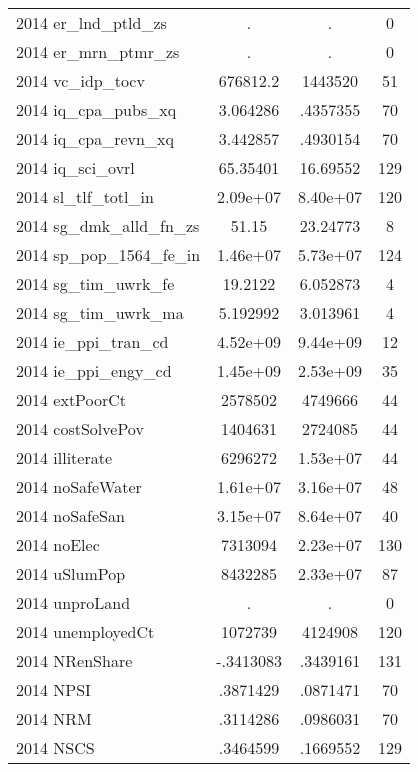 {\begin{tabular}{l*{1}{ccc}}
2014 er\_lnd\_ptld\_zs &           .&           .&           0\\
2014 er\_mrn\_ptmr\_zs &           .&           .&           0\\
2014 vc\_idp\_tocv    &    676812.2&     1443520&          51\\
2014 iq\_cpa\_pubs\_xq &    3.064286&    .4357355&          70\\
2014 iq\_cpa\_revn\_xq &    3.442857&    .4930154&          70\\
2014 iq\_sci\_ovrl    &    65.35401&    16.69552&         129\\
2014 sl\_tlf\_totl\_in &    2.09e+07&    8.40e+07&         120\\
2014 sg\_dmk\_alld\_fn\_zs&       51.15&    23.24773&           8\\
2014 sp\_pop\_1564\_fe\_in&    1.46e+07&    5.73e+07&         124\\
2014 sg\_tim\_uwrk\_fe &     19.2122&    6.052873&           4\\
2014 sg\_tim\_uwrk\_ma &    5.192992&    3.013961&           4\\
2014 ie\_ppi\_tran\_cd &    4.52e+09&    9.44e+09&          12\\
2014 ie\_ppi\_engy\_cd &    1.45e+09&    2.53e+09&          35\\
2014 extPoorCt      &     2578502&     4749666&          44\\
2014 costSolvePov   &     1404631&     2724085&          44\\
2014 illiterate     &     6296272&    1.53e+07&          44\\
2014 noSafeWater    &    1.61e+07&    3.16e+07&          48\\
2014 noSafeSan      &    3.15e+07&    8.64e+07&          40\\
2014 noElec         &     7313094&    2.23e+07&         130\\
2014 uSlumPop       &     8432285&    2.33e+07&          87\\
2014 unproLand      &           .&           .&           0\\
2014 unemployedCt   &     1072739&     4124908&         120\\
2014 NRenShare      &   -.3413083&    .3439161&         131\\
2014 NPSI           &    .3871429&    .0871471&          70\\
2014 NRM            &    .3114286&    .0986031&          70\\
2014 NSCS           &    .3464599&    .1669552&         129\\

\end{tabular}}
